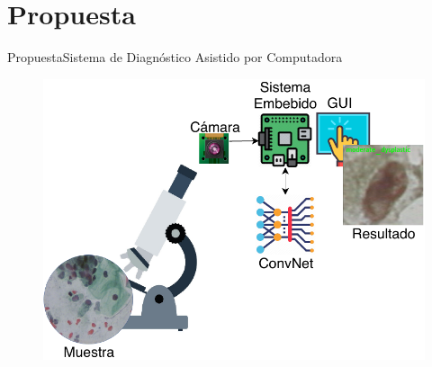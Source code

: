 \documentclass{beamer}
\begin{document}
    \section{Propuesta}
    \begin{frame}{Propuesta}{Sistema de Diagnóstico Asistido por Computadora}
        \begin{figure}[]
            \centering
            \includegraphics[height=0.95\textheight]{diagrama_sistema}
        \end{figure}
    \end{frame}

        
            
\end{document}
